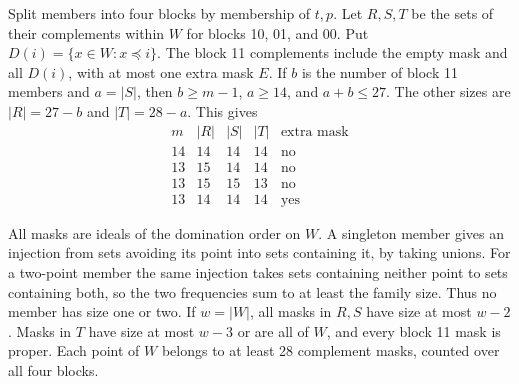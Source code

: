 \documentclass[10pt]{article}
\begin{document}
Split members into four blocks by membership of \(t,p\). Let \(R,S,T\)
be the sets of their complements within \(W\) for blocks 10, 01, and
00. Put \(D(i)=\{x\in W:x\preceq i\}\). The block 11 complements
include the empty mask and all \(D(i)\), with at most one extra mask
\(E\). If \(b\) is the number of block 11 members and \(a=|S|\), then
\(b\ge m-1\), \(a\ge14\), and \(a+b\le27\). The other sizes are
\(|R|=27-b\) and \(|T|=28-a\). This gives
\[
\begin{array}{c|rrr|c}
m & |R| & |S| & |T| & \text{extra mask}\\ \hline
14 &14&14&14&\text{no}\\
13 &15&14&14&\text{no}\\
13 &15&15&13&\text{no}\\
13 &14&14&14&\text{yes}
\end{array}
\]

All masks are ideals of the domination order on \(W\). A singleton
member gives an injection from sets avoiding its point into sets
containing it, by taking unions. For a two-point member the same
injection takes sets containing neither point to sets containing both,
so the two frequencies sum to at least the family size. Thus no
member has size one or two. If \(w=|W|\), all masks in \(R,S\) have
size at most \(w-2\). Masks in \(T\) have size at most \(w-3\) or
are all of \(W\), and every block 11 mask is proper. Each point of
\(W\) belongs to at least 28 complement masks, counted over all four blocks.
\end{document}
